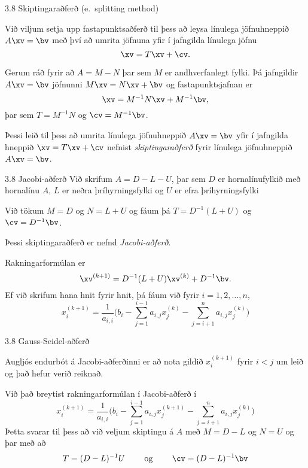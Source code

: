 \begin{frame}{3.8 Skiptingaraðferð (e.~splitting method)}

Við viljum setja upp fastapunktsaðferð til þess að leysa línulega
jöfnuhneppið $A\xv=\bv$ með því að umrita jöfnuna yfir í jafngilda
línulega jöfnu
$$
\xv=T\xv+\cv.
$$ 

\pause
\smallskip
Gerum ráð fyrir að $A=M-N$ þar sem $M$ er andhverfanlegt fylki.
Þá jafngildir $A\xv=\bv$ jöfnunni $M\xv=N\xv+\bv$ og fastapunktsjafnan
er
$$
\xv=M^{-1}N\xv+M^{-1}\bv,
$$
þar sem $T = M^{-1}N$ og $\cv = M^{-1}\bv$.
\pause

\smallskip
Þessi leið til þess að umrita línulega jöfnuhneppið $A\xv=\bv$ yfir í
jafngilda hneppið $\xv=T\xv+\cv$ nefnist {\it skiptingaraðferð} fyrir
línulega jöfnuhneppið $A\xv=\bv$.  
\end{frame}

\begin{frame}{3.8 Jacobi-aðferð}
Við skrifum $A=D-L-U$, þar sem $D$ er hornalínufylkið með hornalínu
$A$, $L$ er neðra þríhyrningsfylki og $U$ er efra þríhyrningsfylki

\pause
\smallskip
Við tökum $M=D$ og $N=L+U$ og fáum þá $T=D^{-1}(L+U)$ og
$\cv=D^{-1}\bv$. 

\smallskip
Þessi skiptingaraðferð er nefnd {\it Jacobi-aðferð}.


\smallskip
Rakningarformúlan er
$$
\xv^{(k+1)}=D^{-1}(L+U)\xv^{(k)}+D^{-1}\bv.
$$
Ef við skrifum hana hnit fyrir hnit, þá fáum við 
fyrir $i=1,2,\dots,n$, 
$$
x_i^{(k+1)}=\dfrac 1{a_{i,i}}\bigg(
b_i-\sum_{j=1}^{i-1}a_{i,j}x_j^{(k)}-\sum_{j=i+1}^n a_{i,j}x_j^{(k)}\bigg)
$$
\end{frame}

\begin{frame}{3.8 Gauss-Seidel-aðferð} 

Augljós endurbót á Jacobi-aðferðinni er að nota gildið $x_i^{(k+1)}$ fyrir
$i<j$ um leið og það hefur verið reiknað.  

\pause
\smallskip
Við það breytist rakningarformúlan í Jacobi-aðferð í
$$
x_i^{(k+1)}=\dfrac 1{a_{i,i}}\bigg(
b_i-\sum_{j=1}^{i-1}a_{i,j}x_j^{(k+1)}-\sum_{j=i+1}^n a_{i,j}x_j^{(k)}\bigg)
$$
Þetta svarar til þess að við veljum skiptingu á $A$ með 
$M=D-L$ og $N=U$ og þar með að
$$
T=(D-L)^{-1}U \qquad \text{ og } \qquad \cv=(D-L)^{-1} \bv
$$
\end{frame}

